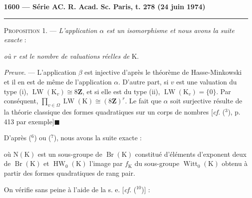 \textbf{1600 — Série A}\hfill\textbf{C. R. Acad. Sc. Paris, t. 278 (24 juin 1974)}

\rule{\linewidth}{0.4pt}

\textsc{Proposition 1}. — \emph{L'application $\alpha$ est un isomorphisme et nous avons la suite exacte} :


\emph{où $r$ est le nombre de valuations réelles de} K.

\emph{Preuve}. — L'application $\beta$ est injective d'après le théorème de Hasse-Minkowski et
il en est de même de l'application $\alpha$. D'autre part, si $v$ est une valuation du type (i),
$\operatorname{LW}(\mathrm K_v)\cong8\mathbf Z$, et si elle est du type (ii), $\operatorname{LW}(\mathrm K_v)=\{0\}$. Par conséquent,
$\displaystyle\prod_{v\in\Omega}\operatorname{LW}(\mathrm K)\cong(8\mathbf Z)^r$. Le fait que $\alpha$ soit surjective résulte de la théorie classique des formes
quadratiques sur un corps de nombres [\emph{cf.} (${}^3$), p. 413 par exemple]\quad$\blacksquare$

D'après (${}^6$) ou (${}^7$), nous avons la suite exacte :


où $\mathrm N(\mathrm K)$ est un sous-groupe de $\operatorname{Br}(\mathrm K)$ constitué d'éléments d'exponent deux de $\operatorname{Br}(\mathrm K)$
et $\operatorname{HW}_0(\mathrm K)$ l'image par $f_{\mathrm K}$ du sous-groupe $\operatorname{Witt}_0(\mathrm K)$ obtenu à partir des formes quadratiques
de rang pair.

On vérifie sans peine à l'aide de la s. e. [\emph{cf.} (${}^{10}$)] :


